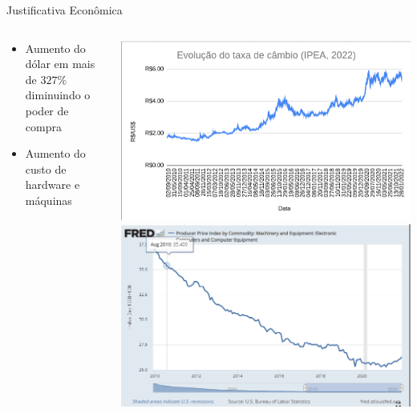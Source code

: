 \documentclass[10pt,brazil]{beamer}
\theoremstyle{definition}
\begin{document}
\begin{frame}{Justificativa Econômica}
  \begin{columns}
    \begin{column}{0.5\textwidth}
      \begin{itemize}
            \item Aumento do dólar em mais de $327\%$ diminuindo o poder de compra
            \item Aumento do custo de hardware e máquinas
      \end{itemize}
    \end{column}
    \begin{column}{0.5\textwidth}  %
      \begin{center}
        \includegraphics[width=1\textwidth]{variacaodolar.png}        \includegraphics[width=1\textwidth]{hardwarecost.png}
      \end{center}
    \end{column}
  \end{columns}
\end{frame}
\end{document}
